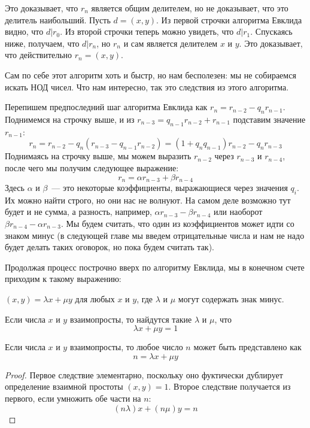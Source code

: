 Это доказывает, что $r_n$ является общим делителем, но не доказывает, что это делитель наибольший. Пусть $d = (x, y)$. Из первой строчки алгоритма Евклида видно, что $d|r_0$. Из второй строчки теперь можно увидеть, что $d|r_1$. Спускаясь ниже, получаем, что $d|r_n$, но $r_n$ и сам является делителем $x$ и $y$. Это доказывает, что действительно $r_n = (x, y)$.

Сам по себе этот алгоритм хоть и быстр, но нам бесполезен: мы не собираемся искать НОД чисел. Что нам интересно, так это следствия из этого алгоритма.

Перепишем предпоследний шаг алгоритма Евклида как $r_n = r_{n-2} - q_n r_{n-1}$. Поднимемся на строчку выше, и из $r_{n-3} = q_{n-1} r_{n-2} + r_{n-1}$ подставим значение $r_{n-1}$:
$$r_n = r_{n-2} - q_n(r_{n-3} - q_{n-1}r_{n-2}) = (1+q_n q_{n-1})r_{n-2} - q_n r_{n-3}$$
Поднимаясь на строчку выше, мы можем выразить $r_{n-2}$ через $r_{n-3}$ и $r_{n-4}$, после чего мы получим следующее выражение:
$$r_n = \alpha r_{n-3} + \beta r_{n-4}$$
Здесь $\alpha$ и $\beta$~--- это некоторые коэффициенты, выражающиеся через значения $q_i$. Их можно найти строго, но они нас не волнуют. На самом деле возможно тут будет и не сумма, а разность, например, $\alpha r_{n-3} - \beta r_{n-4}$ или наоборот $\beta r_{n-4} - \alpha r_{n-3}$. Мы будем считать, что один из коэффициентов может идти со знаком минус (в следующей главе мы введем отрицательные числа и нам не надо будет делать таких оговорок, но пока будем считать так).

Продолжая процесс построчно вверх по алгоритму Евклида, мы в конечном счете приходим к такому выражению:

\begin{Bezus}
$(x, y) = \lambda x + \mu y$ для любых $x$ и $y$, где $\lambda$ и $\mu$ могут содержать знак минус.
\end{Bezus}
\begin{corollary}
Если числа $x$ и $y$ взаимопросты, то найдутся такие $\lambda$ и $\mu$, что
$$\lambda x + \mu y = 1$$
\end{corollary}
\begin{corollary}
Если числа $x$ и $y$ взаимопросты, то любое число $n$ может быть представлено как
$$n = \lambda x + \mu y$$
\end{corollary}
\begin{proof}
Первое следствие элементарно, поскольку оно фуктически дублирует определение взаимной простоты $(x, y) = 1$. Второе следствие получается из первого, если умножить обе части на $n$:
$$(n\lambda) x + (n\mu) y = n$$
\end{proof}

